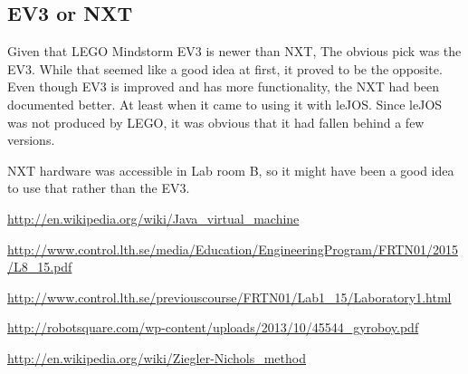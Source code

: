 \subsection{EV3 or NXT}
Given that LEGO Mindstorm EV3 is newer than NXT, The obvious pick was the EV3. While that seemed like a good idea at first, it proved to be the opposite. Even though EV3 is improved and has more functionality, the NXT had been documented better. At least when it came to using it with leJOS. Since leJOS was not produced by LEGO, it was obvious that it had fallen behind a few versions.

NXT hardware was accessible in Lab room B, so it might have been a good idea to use that rather than the EV3.

\newpage

\begin{thebibliography}{99}

\url{http://en.wikipedia.org/wiki/Java_virtual_machine}

\url{http://www.control.lth.se/media/Education/EngineeringProgram/FRTN01/2015/L8_15.pdf}

\url{http://www.control.lth.se/previouscourse/FRTN01/Lab1_15/Laboratory1.html}

\url{http://robotsquare.com/wp-content/uploads/2013/10/45544_gyroboy.pdf}

\url{http://en.wikipedia.org/wiki/Ziegler-Nichols_method}

\end{thebibliography}


%
%
